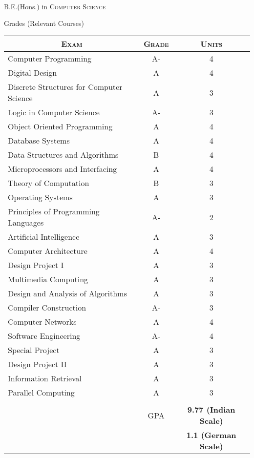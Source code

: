 \documentclass[a4paper,10pt]{article} %
\begin{document}

\bigskip

\par{\centering\Large \hypertarget{grds_bits}{B.E.(Hons.) in \textsc{Computer Science}}\par}\large{\centering Grades (Relevant Courses)\par}\normalsize

\begin{center}
\begin{tabular}{lcc}
\multicolumn{1}{c}{\textsc{Exam}} & \textsc{Grade} & \textsc{Units}\\ 
\hline
Computer Programming & A- & 4\\
Digital Design & A & 4\\
Discrete Structures for Computer Science & A & 3\\
Logic in Computer Science & A- & 3\\
Object Oriented Programming & A & 4\\
Database Systems & A & 4\\
Data Structures and Algorithms & B & 4\\
Microprocessors and Interfacing & A & 4\\
Theory of Computation & B & 3\\
Operating Systems & A & 3\\
Principles of Programming Languages & A- & 2\\
Artificial Intelligence & A & 3\\
Computer Architecture & A & 4\\
Design Project I & A & 3\\
Multimedia Computing & A & 3\\
Design and Analysis of Algorithms & A & 3\\
Compiler Construction & A- & 3\\
Computer Networks & A & 4\\
Software Engineering & A- & 4\\
Special Project & A & 3\\
Design Project II & A & 3\\
Information Retrieval & A & 3\\
Parallel Computing & A & 3\\
& &\\\cline{2-3}
& \textsc{GPA} & \textbf{9.77 (Indian Scale)}\\ && \textbf{1.1 (German Scale)}
\end{tabular}
\end{center}

\end{document}
